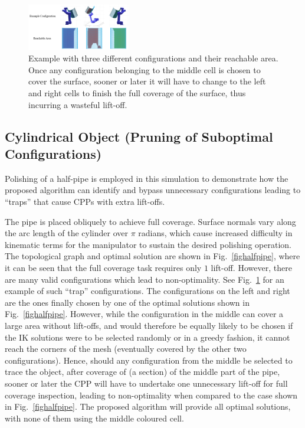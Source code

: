 \documentclass[journal]{IEEEtran}
\begin{document}
\begin{figure}[tb]
\centering
\includegraphics[width = 0.4\textwidth]{figures/simu_exp/exp_pipe/three_example_pose}
\caption{Example with three different configurations and their reachable area. Once any configuration belonging to the middle cell is chosen to cover the surface, sooner or later it will have to change to the left and right cells to finish the full coverage of the surface, thus incurring a wasteful lift-off.}
\label{figthreeexamplepose}
\end{figure}

\subsection{Cylindrical Object (Pruning of Suboptimal Configurations)}
\label{sec:cyl_sim_examples}
Polishing of a half-pipe is employed in this simulation to demonstrate how the proposed algorithm can identify and bypass unnecessary configurations leading to ``traps'' that cause CPPs with extra lift-offs. 

The pipe is placed obliquely to achieve full coverage. Surface normals vary along the arc length of the cylinder 
over $\pi$ radians, which cause increased difficulty in kinematic terms for the manipulator 
to sustain the desired polishing operation. 
The topological graph and optimal solution are shown in Fig.~\ref{fighalfpipe}, where it can be seen that the full coverage task requires only $1$ lift-off. 
However, there are many valid configurations which lead to non-optimality. 
See Fig.~\ref{figthreeexamplepose} for an example of such ``trap'' configurations. 
The configurations on the left and right are the ones finally chosen by one of the optimal solutions shown in Fig.~\ref{fighalfpipe}. 
However, while the configuration in the middle can cover a large area without lift-offs, and would therefore be equally likely to be chosen if the IK solutions were to be selected randomly or in a greedy fashion, it cannot reach the corners of the mesh (eventually covered by the other two configurations). Hence, should any configuration from the middle be selected to trace 
the object, after coverage of (a section) of the middle part of the pipe, sooner or later the CPP will have to undertake one unnecessary lift-off for full coverage inspection, leading to non-optimality when compared to the case shown in Fig.~\ref{fighalfpipe}. The proposed algorithm will provide all optimal solutions, with none of them using the middle coloured cell.
\end{document}
